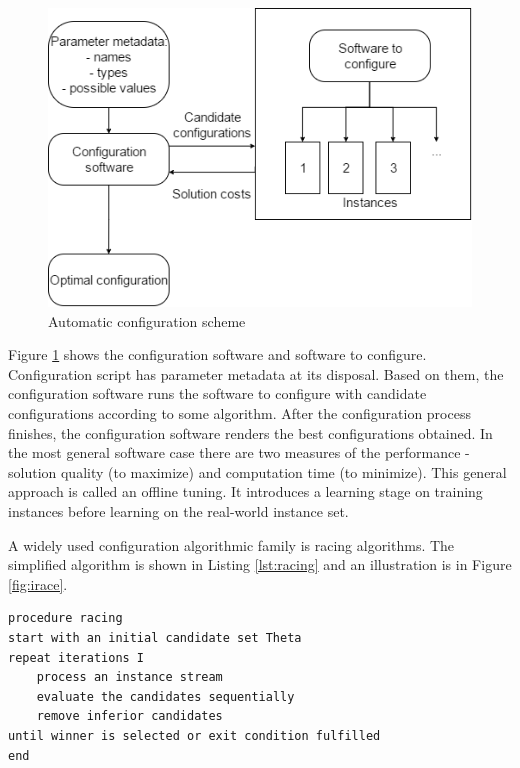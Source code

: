 \documentclass[12pt,a4paper,oneside]{book}
\begin{document}
\begin{figure}
  \centering
    \includegraphics[scale=0.7]{configuration-top-level.png}
  \caption{Automatic configuration scheme}
  \label{fig:autoconf}
\end{figure}

Figure \ref{fig:autoconf} shows the configuration software and software to configure. Configuration script has parameter metadata at its disposal. Based on them, the configuration software runs the software to configure with candidate configurations according to some algorithm. After the configuration process finishes, the configuration software renders the best configurations obtained. In the most general software case there are two measures of the performance - solution quality (to maximize) and computation time (to minimize). This general approach is called an offline tuning. It introduces a learning stage on training instances before learning on the real-world instance set.


A widely used configuration algorithmic family is racing algorithms. The simplified algorithm is shown in Listing \ref{lst:racing} and an illustration is in Figure \ref{fig:irace}.


\begin{minipage}[c, breaklines=true]{0.95\textwidth}
\begin{lstlisting}[caption={General racing pseudo-code}, label={lst:racing}]
procedure racing
start with an initial candidate set Theta
repeat iterations I
	process an instance stream
	evaluate the candidates sequentially
	remove inferior candidates
until winner is selected or exit condition fulfilled
end
\end{lstlisting}
\end{minipage}
\end{document}
